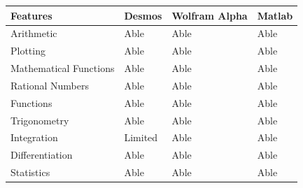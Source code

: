 \documentclass[a4paper, oneside, 11pt]{report}
\begin{document}
    \begin{center}
        \begin{table}[h]
            \begin{tabular}{|l|l|l|l|}
                \hline
                Features               & Desmos  & Wolfram Alpha & Matlab \\ \hline
                Arithmetic             & Able    & Able          & Able   \\ \hline
                Plotting               & Able    & Able          & Able   \\ \hline
                Mathematical Functions & Able    & Able          & Able   \\ \hline
                Rational Numbers       & Able    & Able          & Able   \\ \hline
                Functions              & Able    & Able          & Able   \\ \hline
                Trigonometry           & Able    & Able          & Able   \\ \hline
                Integration            & Limited & Able          & Able   \\ \hline
                Differentiation        & Able    & Able          & Able   \\ \hline
                Statistics             & Able    & Able          & Able   \\ \hline
            \end{tabular}
        \end{table}
    \end{center}
\end{document}
